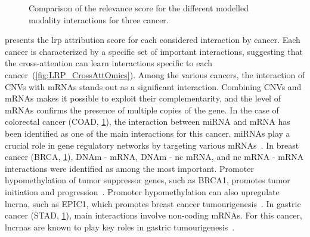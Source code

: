 \documentclass[../main.tex]{subfiles}
\begin{document}
\begin{figure}
			\caption{Comparison of the  relevance score for the different modelled modality interactions for three cancer.}\label{fig:LRP_CrossAttOmics_subset}
		\end{figure}
		 presents the \gls{lrp} attribution score for each considered interaction by cancer.
		Each cancer is characterized by a specific set of important interactions, suggesting that the cross-attention can learn interactions specific to each cancer~(\cref{fig:LRP_CrossAttOmics}).
		Among the various cancers, the interaction of CNVs with mRNAs stands out as a significant interaction.
		Combining CNVs and mRNAs makes it possible to exploit their complementarity, and the level of mRNAs confirms the presence of multiple copies of the gene.
		In the case of colorectal cancer (COAD, \cref{fig:LRP_CrossAttOmics_subset}),  the interaction between miRNA and mRNA has been identified as one of the main interactions for this cancer.
		miRNAs play a crucial role in gene regulatory networks by targeting various mRNAs~\cite{Amirkhah2015}.
		In breast cancer (BRCA, \cref{fig:LRP_CrossAttOmics_subset}), DNAm - mRNA, DNAm - nc mRNA, and nc mRNA - mRNA interactions were identified as among the most important.
		Promoter hypomethylation of tumor suppressor genes, such as BRCA1, promotes tumor initiation and progression~\cite{Szyf2004}.
		Promoter hypomethylation can also upregulate \gls{lncrna}, such as EPIC1, which promotes breast cancer tumourigenesis~\cite{Wang2018}.
		In gastric cancer (STAD, \cref{fig:LRP_CrossAttOmics_subset}), main interactions involve non-coding mRNAs.
		For this cancer, \glspl{lncrna} are known to play key roles in gastric tumourigenesis~\cite{Tan2020}.
\end{document}

